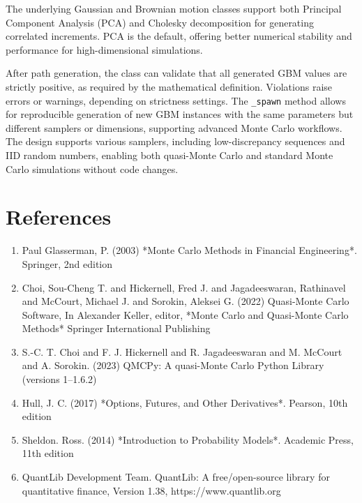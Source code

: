 \documentclass{article}
\begin{document}
The underlying Gaussian and Brownian motion classes support both Principal Component Analysis (PCA) and Cholesky decomposition for generating correlated increments. PCA is the default, offering better numerical stability and performance for high-dimensional simulations.

After path generation, the class can validate that all generated GBM values are strictly positive, as required by the mathematical definition. Violations raise errors or warnings, depending on strictness settings.
The \texttt{\_spawn} method allows for reproducible generation of new GBM instances with the same parameters but different samplers or dimensions, supporting advanced Monte Carlo workflows.  The design supports various samplers, including low-discrepancy sequences and IID random numbers, enabling both quasi-Monte Carlo and standard Monte Carlo simulations without code changes.
\section*{References}

\begin{enumerate}
\item  Paul Glasserman, P. (2003) *Monte Carlo Methods in Financial Engineering*. Springer, 2nd edition
\item  Choi, Sou-Cheng T.
and Hickernell, Fred J.
and Jagadeeswaran, Rathinavel
and McCourt, Michael J.
and Sorokin, Aleksei G. (2022) Quasi-Monte Carlo Software, In Alexander Keller, editor, *Monte Carlo and Quasi-Monte Carlo Methods* Springer International Publishing
\item S.-C. T. Choi and F. J. Hickernell and R. Jagadeeswaran and M. McCourt and A. Sorokin. (2023) QMCPy: A quasi-Monte Carlo Python Library (versions 1--1.6.2)
\item  Hull, J. C. (2017) *Options, Futures, and Other Derivatives*. Pearson, 10th edition
\item   Sheldon. Ross. (2014) *Introduction to Probability Models*. Academic Press, 11th edition
\item  QuantLib Development Team. QuantLib: A free/open-source library for quantitative finance, Version 1.38, https://www.quantlib.org
\end{enumerate}
 
\end{document}
